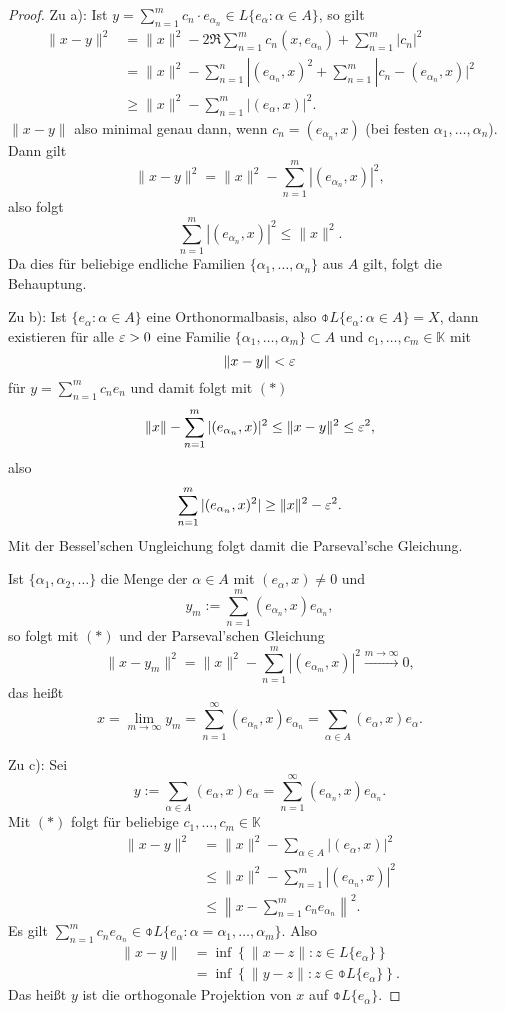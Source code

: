 \begin{proof}
Zu a): Ist $y = \sum_{n=1}^m c_n \cdot e_{\alpha_n} \in L\{ e_\alpha : \alpha
\in A \}$, so gilt
\begin{align*}
  \| x - y \|^2
  &= \| x \|^2 - 2 \Re \sum_{n=1}^m c_n (x, e_{\alpha_n})
    + \sum_{n=1}^m | c_n |^2 \\
  &= \| x \|^2 - \sum_{n=1}^n |(e_{\alpha_n}, x)^2
    + \sum_{n=1}^m |c_n - (e_{\alpha_n}, x) |^2 \tag{$*$}\\
  &\ge \| x \|^2 - \sum_{n=1}^m | (e_\alpha, x) |^2.
\end{align*}
$\| x - y \|$ also minimal genau dann, wenn $c_n = (e_{\alpha_n}, x)$ (bei
festen $\alpha_1, \ldots, \alpha_n$). Dann gilt
\[ \| x - y \|^2 = \| x \|^2 - \sum_{n=1}^m | (e_{\alpha_n}, x) |^2,\]
also folgt
\[ \sum_{n=1}^m |(e_{\alpha_n}, x)|^2 \le \| x \|^2. \]
Da dies für beliebige endliche Familien $\{\alpha_1, \ldots, \alpha_n\}$ aus $A$
gilt, folgt die Behauptung.

Zu b): Ist $\{ e_\alpha : \alpha \in A \}$ eine Orthonormalbasis, also
$\obar{L\{e_\alpha : \alpha \in A\}} = X$, dann existieren für alle $\varepsilon > 0$
eine Familie $\{ \alpha_1, \ldots, \alpha_m \} \subset A$ und $c_1, \ldots, c_m
\in \mathbb{K}$ mit
\[ \| x - y \| < \varepsilon \]
für $y = \sum_{n=1}^m c_n e_n$ und damit folgt mit $(*)$
\[ \| x \| - \sum_{n=1}^m |(e_{\alpha_n},x)|^2 \le \| x - y \|^2 \le \varepsilon^2, \]
also
\[ \sum_{n=1}^m |(e_{\alpha_n},x)^2| \ge \| x \|^2 - \varepsilon^2. \]
Mit der Bessel'schen Ungleichung folgt damit die Parseval'sche Gleichung.

Ist $\{ \alpha_1, \alpha_2, \ldots \}$ die Menge der $\alpha \in A$ mit
$(e_\alpha, x) \ne 0$ und
\[ y_m := \sum_{n=1}^m (e_{\alpha_n}, x) e_{\alpha_n}, \]
so folgt mit $(*)$ und der Parseval'schen Gleichung
\[ \| x - y_m \|^2 = \|x\|^2 - \sum_{n=1}^m |(e_{\alpha_m},x)|^2 \xrightarrow{m
    \to \infty} 0, \]
das heißt
\[ x = \lim_{m \to \infty} y_m = \sum_{n=1}^\infty (e_{\alpha_n},x)
  e_{\alpha_n} = \sum_{\alpha \in A} (e_{\alpha}, x) e_\alpha. \]

Zu c): Sei
\[ y := \sum_{\alpha \in A} (e_\alpha, x) e_\alpha = \sum_{n=1}^\infty
  (e_{\alpha_n}, x) e_{\alpha_n}. \]
Mit $(*)$ folgt für beliebige $c_1, \ldots, c_m \in \mathbb{K}$
\begin{align*}
  \| x - y \|^2
  &= \| x \|^2 - \sum_{\alpha \in A} |(e_\alpha,x)|^2 \\
  &\le \| x \|^2 - \sum_{n=1}^m |(e_{\alpha_n},x)|^2 \\
  &\le \left\| x - \sum_{n=1}^m c_n e_{\alpha_n} \right\|^2.
\end{align*}
Es gilt $\sum_{n=1}^m c_n e_{\alpha_n} \in \obar{L \{ e_\alpha : \alpha =
  \alpha_1, \ldots, \alpha_m\}}$. Also
\begin{align*}
  \| x - y \|
  &= \inf \left\{ \| x - z \| : z \in L\{e_\alpha\} \right\} \\
  &= \inf \left\{ \| y - z \| : z \in \obar{L\{e_\alpha\}} \right\}.
\end{align*}
Das heißt $y$ ist die orthogonale Projektion von $x$ auf $\obar{L\{e_\alpha\}}$.
\end{proof}

